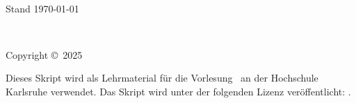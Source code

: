 \documentclass[11pt,fleqn, oneside]{book} %
\date{\today}
\begin{document}
\createTikZTitlePage{\scriptFaculty}   
{{\huge\textbf{\scriptTitle\\}}{Stand \today}}   
{\scriptAuthor}


\newpage
~\vfill
\thispagestyle{empty}

\noindent Copyright \copyright\ 2025 \scriptAuthor %


\noindent {\url{\scriptWebsite}} %

\noindent
Dieses Skript wird als Lehrmaterial für die Vorlesung \scriptCourse\ an der Hochschule Karlsruhe verwendet.
Das Skript wird unter der folgenden Lizenz veröffentlicht: \scriptLicense.

\noindent \textit{\scriptEdition} %




\pagestyle{empty} %

\tableofcontents %

\cleardoublepage %

\pagestyle{fancy} %






\end{document}
